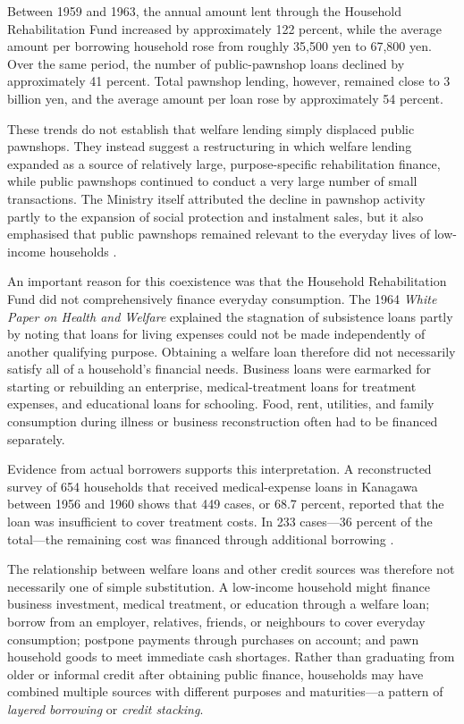 \documentclass[12pt]{article}
\begin{document}
Between 1959 and 1963, the annual amount lent through the Household Rehabilitation Fund increased by approximately 122 percent, while the average amount per borrowing household rose from roughly 35,500 yen to 67,800 yen. Over the same period, the number of public-pawnshop loans declined by approximately 41 percent. Total pawnshop lending, however, remained close to 3 billion yen, and the average amount per loan rose by approximately 54 percent.

These trends do not establish that welfare lending simply displaced public pawnshops. They instead suggest a restructuring in which welfare lending expanded as a source of relatively large, purpose-specific rehabilitation finance, while public pawnshops continued to conduct a very large number of small transactions. The Ministry itself attributed the decline in pawnshop activity partly to the expansion of social protection and instalment sales, but it also emphasised that public pawnshops remained relevant to the everyday lives of low-income households \citep{MinistryOfHealth1963, MinistryOfHealth1964}.

An important reason for this coexistence was that the Household Rehabilitation Fund did not comprehensively finance everyday consumption. The 1964 \textit{White Paper on Health and Welfare} explained the stagnation of subsistence loans partly by noting that loans for living expenses could not be made independently of another qualifying purpose. Obtaining a welfare loan therefore did not necessarily satisfy all of a household's financial needs. Business loans were earmarked for starting or rebuilding an enterprise, medical-treatment loans for treatment expenses, and educational loans for schooling. Food, rent, utilities, and family consumption during illness or business reconstruction often had to be financed separately.

Evidence from actual borrowers supports this interpretation. A reconstructed survey of 654 households that received medical-expense loans in Kanagawa between 1956 and 1960 shows that 449 cases, or 68.7 percent, reported that the loan was insufficient to cover treatment costs. In 233 cases---36 percent of the total---the remaining cost was financed through additional borrowing \citep{Sakai2023}.

The relationship between welfare loans and other credit sources was therefore not necessarily one of simple substitution. A low-income household might finance business investment, medical treatment, or education through a welfare loan; borrow from an employer, relatives, friends, or neighbours to cover everyday consumption; postpone payments through purchases on account; and pawn household goods to meet immediate cash shortages. Rather than graduating from older or informal credit after obtaining public finance, households may have combined multiple sources with different purposes and maturities---a pattern of \textit{layered borrowing} or \textit{credit stacking}.
\end{document}
